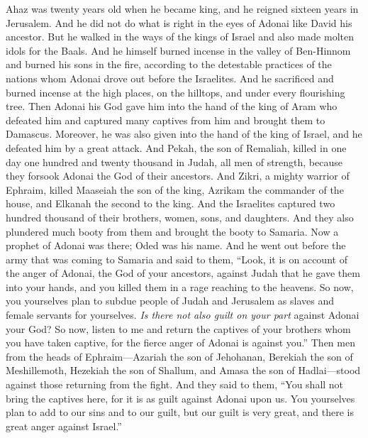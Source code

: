 \begin{biblechapter} %
 Ahaz was twenty years old when he became king, and he reigned sixteen years in Jerusalem. And he did not do what is right in the eyes of Adonai like David his ancestor.
\verse But he walked in the ways of the kings of Israel and also made molten idols for the Baals.
\verse And he himself burned incense in the valley of Ben-Hinnom and burned his sons in the fire, according to the detestable practices of the nations whom Adonai drove out before the Israelites.
\verse And he sacrificed and burned incense at the high places, on the hilltops, and under every flourishing tree.
\verse Then Adonai his God gave him into the hand of the king of Aram who defeated him and captured many captives from him and brought them to Damascus. Moreover, he was also given into the hand of the king of Israel, and he defeated him by a great attack.
\verse And Pekah, the son of Remaliah, killed in one day one hundred and twenty thousand in Judah, all men of strength, because they forsook Adonai the God of their ancestors.
\verse And Zikri, a mighty warrior of Ephraim, killed Maaseiah the son of the king, Azrikam the commander of the house, and Elkanah the second to the king.
\verse And the Israelites captured two hundred thousand of their brothers, women, sons, and daughters. And they also plundered much booty from them and brought the booty to Samaria.
\verse Now a prophet of Adonai was there; Oded was his name. And he went out before the army that was coming to Samaria and said to them, “Look, it is on account of the anger of Adonai, the God of your ancestors, against Judah that he gave them into your hands, and you killed them in a rage reaching to the heavens.
\verse So now, you yourselves plan to subdue people of Judah and Jerusalem as slaves and female servants for yourselves. \textit{Is there not also guilt on your part} against Adonai your God?
\verse So now, listen to me and return the captives of your brothers whom you have taken captive, for the fierce anger of Adonai is against you.”
\verse Then men from the heads of Ephraim—Azariah the son of Jehohanan, Berekiah the son of Meshillemoth, Hezekiah the son of Shallum, and Amasa the son of Hadlai—stood against those returning from the fight.
\verse And they said to them, “You shall not bring the captives here, for it is as guilt against Adonai upon us. You yourselves plan to add to our sins and to our guilt, but our guilt is very great, and there is great anger against Israel.”

\end{biblechapter}
